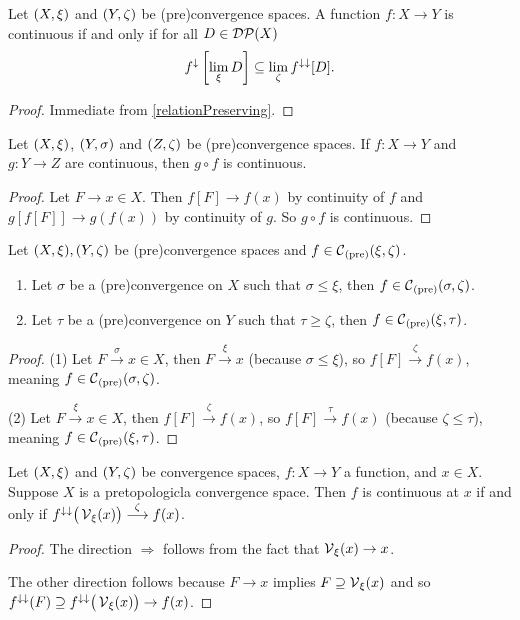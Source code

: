 \begin{lemma}
Let $\sSet{X,\xi}$ and $\sSet{Y,\zeta}$ be (pre)convergence spaces. A function $f: X\to Y$ is continuous \textup{if and only if} for all $D \in \operatorname{\mathcal{DP}}(X)$
\[ f^{\downarrow}\left[\lim_\xi D \right] \subseteq \lim_\zeta f^{\downarrow\downarrow}[D]. \]
\end{lemma}
\begin{proof}
Immediate from \ref{relationPreserving}.
\end{proof}

\begin{lemma} \label{continuityComposition}
Let $\sSet{X,\xi}$, $\sSet{Y,\sigma}$ and $\sSet{Z,\zeta}$ be (pre)convergence spaces. If $f: X\to Y$ and $g: Y\to Z$ are continuous, then $g\circ f$ is continuous.
\end{lemma}
\begin{proof}
Let $F\to x\in X$. Then $f[F] \to f(x)$ by continuity of $f$ and $g[f[F]] \to g(f(x))$ by continuity of $g$. So $g\circ f$ is continuous.
\end{proof}

\begin{lemma} \label{finerCoarserContinuity}
Let $\sSet{X,\xi}, \sSet{Y,\zeta}$ be (pre)convergence spaces and $f\in \operatorname{\mathcal{C}}_\text{(pre)}(\xi, \zeta)$.
\begin{enumerate}
\item Let $\sigma$ be a (pre)convergence on $X$ such that $\sigma \leq \xi$, then $f\in \operatorname{\mathcal{C}}_\text{(pre)}(\sigma, \zeta)$.
\item Let $\tau$ be a (pre)convergence on $Y$ such that $\tau \geq \zeta$, then $f\in \operatorname{\mathcal{C}}_\text{(pre)}(\xi, \tau)$.
\end{enumerate}
\end{lemma}
\begin{proof}
(1) Let $F\overset{\sigma}{\longrightarrow} x \in X$, then $F\overset{\xi}{\longrightarrow} x$ (because $\sigma \leq \xi$), so $f[F]\overset{\zeta}{\longrightarrow} f(x)$, meaning $f\in \operatorname{\mathcal{C}}_\text{(pre)}(\sigma, \zeta)$.

(2) Let $F\overset{\xi}{\longrightarrow} x \in X$, then $f[F]\overset{\zeta}{\longrightarrow} f(x)$, so $f[F]\overset{\tau}{\longrightarrow} f(x)$  (because $\zeta \leq \tau$), meaning $f\in \operatorname{\mathcal{C}}_\text{(pre)}(\xi, \tau)$.
\end{proof}

\begin{lemma}
Let $\sSet{X,\xi}$ and $\sSet{Y,\zeta}$ be convergence spaces, $f: X\to Y$ a function, and $x\in X$. Suppose $X$ is a pretopologicla convergence space. Then $f$ is continuous at $x$ \textup{if and only if} $f^{\downarrow\downarrow}\big(\operatorname{\mathcal{V}}_\xi(x)\big) \overset{\zeta}{\longrightarrow} f(x)$.
\end{lemma}
\begin{proof}
The direction $\Rightarrow$ follows from the fact that $\operatorname{\mathcal{V}}_\xi(x) \to x$.

The other direction follows because $F \to x$ implies $F\supseteq \operatorname{\mathcal{V}}_\xi(x)$ and so $f^{\downarrow\downarrow}(F) \supseteq f^{\downarrow\downarrow}\big(\operatorname{\mathcal{V}}_\xi(x)\big) \to f(x)$.
\end{proof}

